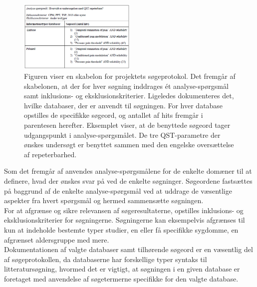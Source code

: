 \begin{figure}[H]
\begin{center}
\includegraphics[width=0.5\textwidth]{figures/cMetode/spex}
\end{center}
\caption{Figuren viser en skabelon for projektets søgeprotokol. Det fremgår af skabelonen, at der for hver søgning inddrages ét analyse-spørgsmål samt inklusions- og eksklusionskriterier. Ligeledes dokumenteres det, hvilke databaser, der er anvendt til søgningen. For hver database opstilles de specifikke søgeord, og antallet af hits fremgår i parentesen herefter. Eksemplet viser, at de benyttede søgeord tager udgangspunkt i analyse-spørgsmålet. De tre QST-parametre der ønskes undersøgt er benyttet sammen med den engelske oversættelse af repeterbarhed.}
\label{fig:soegeprotokol} 
\end{figure} \vspace{-.25cm}

Som det fremgår af  anvendes analyse-spørgsmålene for de enkelte domæner til at definere, hvad der ønskes svar på ved de enkelte søgninger. Søgeordene fastsættes på baggrund af de enkelte analyse-spørgsmål ved at uddrage de væsentlige aspekter fra hvert spørgsmål og hermed sammensætte søgningen.\\ %
For at afgrænse og sikre relevansen af søgeresultaterne, opstilles inklusions- og eksklusionskriterier for søgningerne. Søgningerne kan eksempelvis afgrænses til kun at indeholde bestemte typer studier, en eller få specifikke sygdomme, en afgrænset aldersgruppe med mere. \citep{metodehaandbogen} \\
Dokumentationen af valgte databaser samt tilhørende søgeord er en væsentlig del af søgeprotokollen, da databaserne har forskellige typer syntaks til litteratursøgning, hvormed det er vigtigt, at søgningen i en given database er foretaget med anvendelse af søgetermerne specifikke for den valgte database. \citep{metodehaandbogen}


